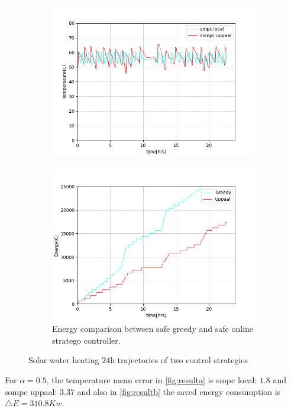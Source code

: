         \begin{figure}[!htb]        
          \begin{subfigure}{0.51\textwidth}
            \includegraphics[width=1.0\linewidth]{images/controllers}
            \captionsetup{format=hang}
             \label{fig:resulta}
          \end{subfigure}
          \hspace*{\fill}
          \begin{subfigure}{0.51\textwidth}
              \includegraphics[width=1.0\linewidth]{images/energycomparison.png}
              \captionsetup{format=hang}
              \caption{Energy comparison between safe greedy and safe online stratego
              controller.} \label{fig:resultb}
          \end{subfigure}%
          \caption{Solar water heating 24h trajectories of two control strategies}
        \end{figure}

      For $\alpha = 0.5$, the temperature mean error in \autoref{fig:resulta} is 
      smpc local:  $1.8$ and sompc uppaal:  $3.37$ and also in \autoref{fig:resultb} 
      the saved energy consumption is $ \bigtriangleup E = 310.8Kw$. %
        
